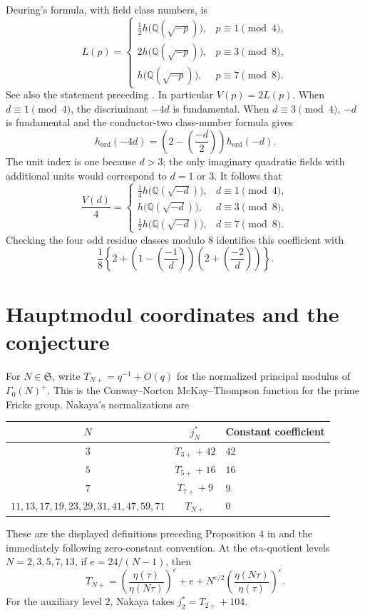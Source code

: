 \documentclass[11pt,a4paper]{article}
\theoremstyle{remark}\newtheorem{remark}[theorem]{Remark}
\numberwithin{equation}{section}
\newcommand{\Q}{\mathbb Q}\newcommand{\Z}{\mathbb Z}
\newcommand{\leg}[2]{\left(\frac{#1}{#2}\right)}
\newcommand{\ho}{h_{\mathrm{ord}}}
\newcommand{\hK}[1]{h\bigl(\Q(\sqrt{-#1})\bigr)}
\begin{document}
Deuring's formula, with field class numbers, is
\begin{equation}\label{eq:deuring}
L(p)=\begin{cases}
\tfrac12\hK{p},&p\equiv1\pmod4,\\
2\hK{p},&p\equiv3\pmod8,\\
\hK{p},&p\equiv7\pmod8.
\end{cases}
\end{equation}
See also the statement preceding \cite[Theorem 1.2]{Morton5b}. In particular $V(p)=2L(p)$. When $d\equiv1\pmod4$, the discriminant $-4d$ is fundamental. When $d\equiv3\pmod4$, $-d$ is fundamental and the conductor-two class-number formula gives
\[
\ho(-4d)=\left(2-\leg{-d}{2}\right)\ho(-d).
\]
The unit index is one because $d>3$; the only imaginary quadratic fields with additional units would correspond to $d=1$ or $3$. It follows that
\begin{equation}\label{eq:Vfield}
\frac{V(d)}4=\begin{cases}
\tfrac14\hK{d},&d\equiv1\pmod4,\\
\hK{d},&d\equiv3\pmod8,\\
\tfrac12\hK{d},&d\equiv7\pmod8.
\end{cases}
\end{equation}
Checking the four odd residue classes modulo $8$ identifies this coefficient with
\begin{equation}\label{eq:coefficient}
\frac18\left\{2+\left(1-\leg{-1}{d}\right)
\left(2+\leg{-2}{d}\right)\right\}.
\end{equation}

\section{Hauptmodul coordinates and the conjecture}\label{sec:haupt}
For $N\in\mathfrak S$, write $T_{N+}=q^{-1}+O(q)$ for the normalized principal modulus of $\Gamma_0(N)^+$. This is the Conway--Norton McKay--Thompson function for the prime Fricke group. Nakaya's normalizations are
\begin{center}
\begin{tabular}{ccl}\toprule
$N$ & $j_N^*$ & Constant coefficient\\\midrule
$3$ & $T_{3+}+42$ & $42$\\
$5$ & $T_{5+}+16$ & $16$\\
$7$ & $T_{7+}+9$ & $9$\\
$11,13,17,19,23,29,31,41,47,59,71$ & $T_{N+}$ & $0$\\\bottomrule
\end{tabular}
\end{center}
These are the displayed definitions preceding Proposition 4 in \cite[Section 4.1]{Nakaya} and the immediately following zero-constant convention. At the eta-quotient levels $N=2,3,5,7,13$, if $e=24/(N-1)$, then
\begin{equation}\label{eq:eta}
T_{N+}=\left(\frac{\eta(\tau)}{\eta(N\tau)}\right)^e
+e+N^{e/2}\left(\frac{\eta(N\tau)}{\eta(\tau)}\right)^e.
\end{equation}
For the auxiliary level $2$, Nakaya takes $j_2^*=T_{2+}+104$.
\end{document}
